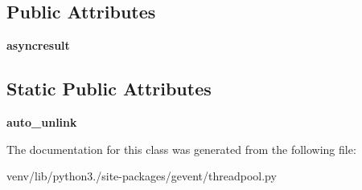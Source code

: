 \subsection*{Public Attributes}
\begin{DoxyCompactItemize}
\item 
\mbox{\label{classgevent_1_1threadpool_1_1___future_proxy_a3f7d865f3c7b4c9c6561746a43491825}} 
{\bfseries asyncresult}
\end{DoxyCompactItemize}
\subsection*{Static Public Attributes}
\begin{DoxyCompactItemize}
\item 
\mbox{\label{classgevent_1_1threadpool_1_1___future_proxy_a953d9cff078ef5b33dfeb10a72604378}} 
{\bfseries auto\+\_\+unlink}
\end{DoxyCompactItemize}


The documentation for this class was generated from the following file\+:\begin{DoxyCompactItemize}
\item 
venv/lib/python3./site-\/packages/gevent/threadpool.\+py\end{DoxyCompactItemize}
